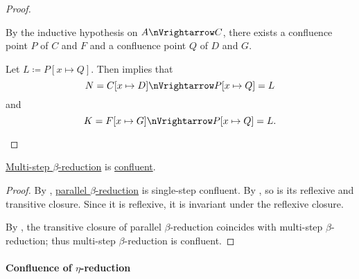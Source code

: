 \begin{proof}
\begin{itemize}
\begin{itemize}
      By the inductive hypothesis on \( A \pred C \), there exists a confluence point \( P \) of \( C \) and \( F \) and a confluence point \( Q \) of \( D \) and \( G \).

      Let \( L \coloneqq P[x \mapsto Q] \). Then  implies that
      \begin{equation*}
        N = C[x \mapsto D] \pred P[x \mapsto Q] = L
      \end{equation*}
      and
      \begin{equation*}
        K = F[x \mapsto G] \pred P[x \mapsto Q] = L.
      \end{equation*}
    \end{itemize}
  \end{itemize}
\end{proof}

\begin{theorem}\label{thm:church_rosser_theorem_for_beta_reduction}
  \hyperref[def:beta_eta_reduction]{Multi-step \( \beta \)-reduction} is \hyperref[def:relation_confluence]{confluent}.
\end{theorem}
\begin{proof}
  By , \hyperref[def:parallel_beta_reduction]{parallel \( \beta \)-reduction} is single-step confluent. By , so is its reflexive and transitive closure. Since it is reflexive, it is invariant under the reflexive closure.

  By , the transitive closure of parallel \( \beta \)-reduction coincides with multi-step \( \beta \)-reduction; thus multi-step \( \beta \)-reduction is confluent.
\end{proof}

\paragraph{Confluence of \( \eta \)-reduction}

